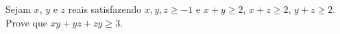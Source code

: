 Sejam $x$, $y$ e $z$ reais satisfazendo $x, y, z \ge -1$ e $x + y \ge 2$, $x + z \ge 2$, $y + z \ge 2$.
Prove que $xy + yz + zy \ge 3$.
